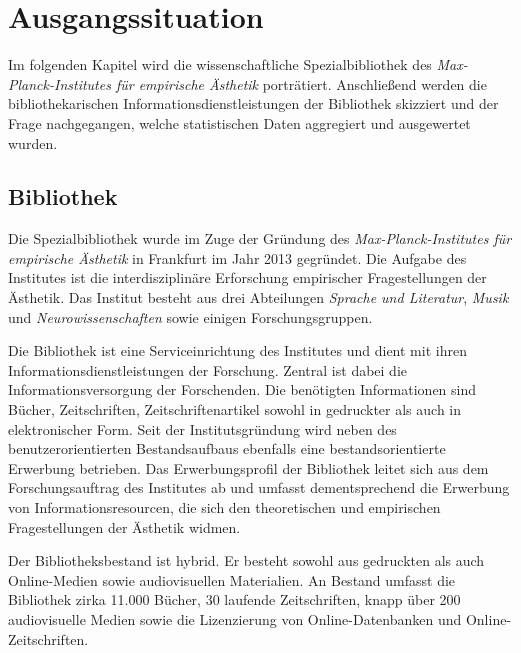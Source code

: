 \chapter{Ausgangssituation}



Im folgenden Kapitel wird die wissenschaftliche Spezialbibliothek des \textit{Max-Planck-Institutes für empirische Ästhetik} 
porträtiert. Anschließend werden die bibliothekarischen Informationsdienstleistungen der Bibliothek 
skizziert und der Frage nachgegangen, welche statistischen Daten aggregiert und ausgewertet wurden. 

\section{Bibliothek}
Die Spezialbibliothek wurde im Zuge der Gründung des \textit{Max-Planck-Institutes für empirische Ästhetik} 
in Frankfurt im Jahr 2013 gegründet. Die Aufgabe des Institutes ist die interdisziplinäre Erforschung 
empirischer Fragestellungen der Ästhetik. Das Institut besteht aus drei Abteilungen \textit{Sprache und Literatur}, 
\textit{Musik} und \textit{Neurowissenschaften} sowie einigen Forschungsgruppen. %



Die Bibliothek ist eine Serviceinrichtung des Institutes und dient mit ihren Informationsdienstleistungen 
der Forschung.
Zentral ist dabei die Informationsversorgung der Forschenden. Die benötigten Informationen sind Bücher, 
Zeitschriften, Zeitschriftenartikel sowohl in gedruckter als auch in elektronischer Form.
Seit der Institutsgründung wird neben des benutzerorientierten Bestandsaufbaus ebenfalls eine bestandsorientierte 
Erwerbung betrieben. Das Erwerbungsprofil der Bibliothek leitet sich aus dem Forschungsauftrag des Institutes 
ab und umfasst dementsprechend die Erwerbung von Informationsresourcen, die sich den theoretischen und 
empirischen Fragestellungen der Ästhetik widmen.

Der Bibliotheksbestand ist hybrid. Er besteht sowohl aus gedruckten als auch Online-Medien sowie 
audiovisuellen Materialien. An Bestand umfasst die Bibliothek zirka 11.000 Bücher, 30 laufende Zeitschriften, 
knapp über 200 audiovisuelle Medien sowie die Lizenzierung von Online-Datenbanken
und Online-Zeitschriften.

